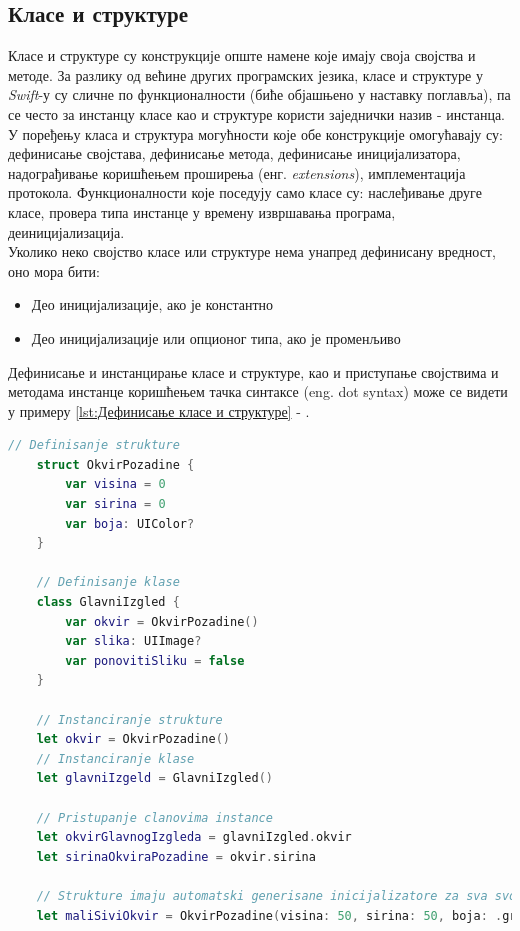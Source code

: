 \documentclass[12pt,oneside]{memoir}
\begin{document}
\subsection{Класе и структуре}

\indent Класе и структуре су конструкције опште намене које имају своја својства и методе. За разлику од већине других програмских језика, класе и структуре у \textit{Swift}-у су сличне по функционалности (биће објашњено у наставку поглавља), па се често за инстанцу класе као и структуре користи заједнички назив - инстанца. 
\\
\indent У поређењу класа и структура могућности које обе конструкције омогућавају су: дефинисање својстава, дефинисање метода, дефинисање иницијализатора, надограђивање коришћењем проширења (енг. \textit{extensions}), имплементација протокола. Функционалности које поседују само класе су: наслеђивање друге класе, провера типа инстанце у времену извршавања програма, деиницијализација.
\\
\indent Уколико неко својство класе или структуре нема унапред дефинисану вредност, оно мора бити: 
\begin{itemize}
    \item Део иницијализације, ако је константно 
    \item Део иницијализације или опционог типа, ако је променљиво 
\end{itemize}
Дефинисање и инстанцирање класе и структуре, као и приступање својствима и методама инстанце коришћењем тачка синтаксе (eng. dot syntax) може се видети у примеру \ref{lst:Дефинисање класе и структуре} - .

\begin{lstlisting}[caption=\textit{{Дефинисање класе и структуре}}, label={lst:Дефинисање класе и структуре}, language=Swift, frame=single]
    // Definisanje strukture
    struct OkvirPozadine {
        var visina = 0
        var sirina = 0
        var boja: UIColor?
    }
    
    // Definisanje klase
    class GlavniIzgled {
        var okvir = OkvirPozadine()
        var slika: UIImage?
        var ponovitiSliku = false
    }
    
    // Instanciranje strukture
    let okvir = OkvirPozadine()
    // Instanciranje klase
    let glavniIzgeld = GlavniIzgled()
    
    // Pristupanje clanovima instance
    let okvirGlavnogIzgleda = glavniIzgled.okvir
    let sirinaOkviraPozadine = okvir.sirina
    
    // Strukture imaju automatski generisane inicijalizatore za sva svojstva
    let maliSiviOkvir = OkvirPozadine(visina: 50, sirina: 50, boja: .gray)
\end{lstlisting}
\end{document}
